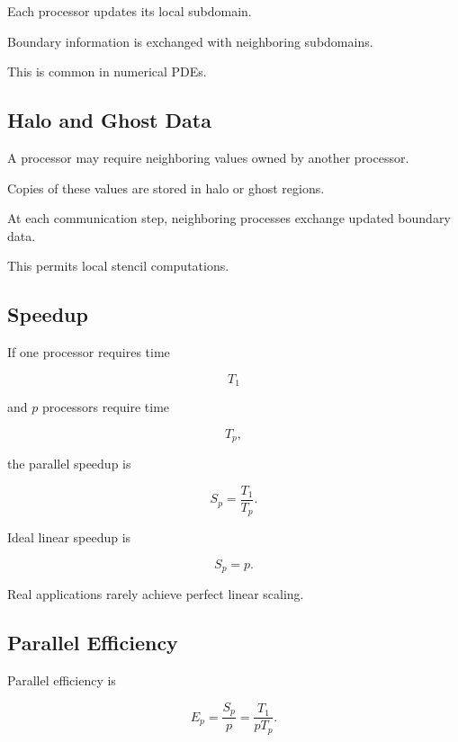Each processor updates its local subdomain.

Boundary information is exchanged with neighboring subdomains.

This is common in numerical PDEs.

\subsection{Halo and Ghost Data}
\label{subsec:halo-ghost-data}

A processor may require neighboring values owned by another processor.

Copies of these values are stored in halo or ghost regions.

At each communication step, neighboring processes exchange updated
boundary data.

This permits local stencil computations.

\subsection{Speedup}
\label{subsec:parallel-speedup}

If one processor requires time

\[
T_1
\]

and \(p\) processors require time

\[
T_p,
\]

the parallel speedup is

\[
\boxed{
S_p
=
\frac{
T_1
}{
T_p
}.
}
\]

Ideal linear speedup is

\[
\boxed{
S_p=p.
}
\]

Real applications rarely achieve perfect linear scaling.

\subsection{Parallel Efficiency}
\label{subsec:parallel-efficiency}

Parallel efficiency is

\[
\boxed{
E_p
=
\frac{
S_p
}{
p
}
=
\frac{
T_1
}{
pT_p
}.
}
\]

